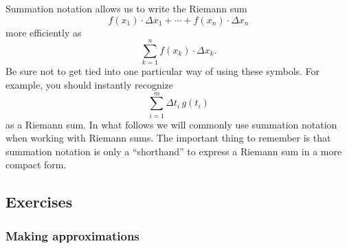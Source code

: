 	Summation notation allows us to write the Riemann sum  
	\[
f(x_1) \cdot \Delta x_1 + \cdots + 
		f(x_n) \cdot \Delta x_n
\]
more efficiently as
	\[
\sum_{k=1}^n f(x_k)\cdot\Delta x_k.
\]
Be sure not to get tied into one particular way of using these symbols.  For example, you should instantly recognize
	\[
\sum_{i=1}^m \Delta t_i \, g(t_i)
\]
as a Riemann sum.  In what follows we will commonly use summation notation when working with Riemann sums.  The important thing to remember is that summation notation is only a ``shorthand'' to express a Riemann sum in a more compact form.

\subsection{Exercises}
\label{subsec:exercises}

\subsubsection{Making approximations}
\label{subsubsec:making-approximations}




